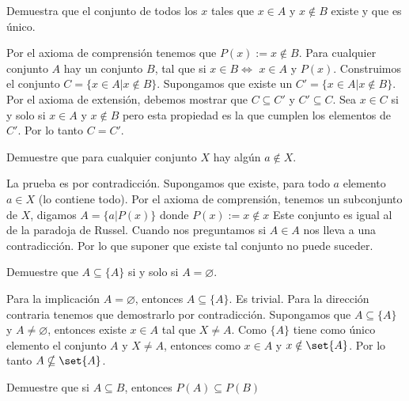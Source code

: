 \documentclass[fc]{tarea}
\begin{document}
\begin{exercise}
    Demuestra que el conjunto de todos los $x$ tales que $x \in A$ y $x \notin B$ existe y que es único.

\end{exercise}

\begin{solution}
Por el axioma de comprensión tenemos que $P(x):= x \notin B$. Para cualquier conjunto $A$ hay un conjunto $B$,
tal que si $x\in B \Leftrightarrow$ $x \in A$ y $P(x)$. Construimos el conjunto $C = \{x \in A| x\notin B\}$.
Supongamos que existe un $C'=\{x \in A| x\notin B\}$. Por el axioma de extensión, debemos mostrar que 
$C \subseteq C'$ y $C' \subseteq C$. Sea $x \in C$ si y solo si $x \in A$ y $x\notin B$
pero esta propiedad es la que cumplen los elementos de $C'$. Por lo tanto $C = C'$.
\end{solution}

\begin{exercise}
    Demuestre que para cualquier conjunto $X$ hay algún $a\notin X$.
\end{exercise}

\begin{solution}
La prueba es por contradicción. Supongamos que existe, para todo $a$ elemento $a \in X$ (lo contiene todo).
Por el axioma de comprensión, tenemos un subconjunto de $X$, digamos $A = \{a | P(x)\}$ donde $P(x):= x\notin x$
Este conjunto es igual al de la paradoja de Russel. Cuando nos preguntamos si $A \in A$ nos lleva a una contradicción.
Por lo que suponer que existe tal conjunto no puede suceder.
\end{solution}

\begin{exercise}
    Demuestre que $A\subseteq \{A\}$ si y solo si $ A = \varnothing$.
\end{exercise}

\begin{solution}
   Para la implicación $A = \varnothing$, entonces $A\subseteq \{A\}$. Es trivial. Para la dirección contraria
   tenemos que demostrarlo por contradicción. Supongamos que $A\subseteq \{A\}$ y $A \neq \varnothing$, entonces
   existe $x \in A$ tal que $X \neq A$. Como $\{A\}$ tiene como único elemento el conjunto $A$ y $X \neq A$, entonces
   como $x \in A$ y $x \notin \set{A}$. Por lo tanto $A \nsubseteq \set{A}$.
\end{solution}

\begin{exercise}
    Demuestre que si $A \subseteq B$, entonces $P(A) \subseteq P(B)$
\end{exercise}
\end{document}
